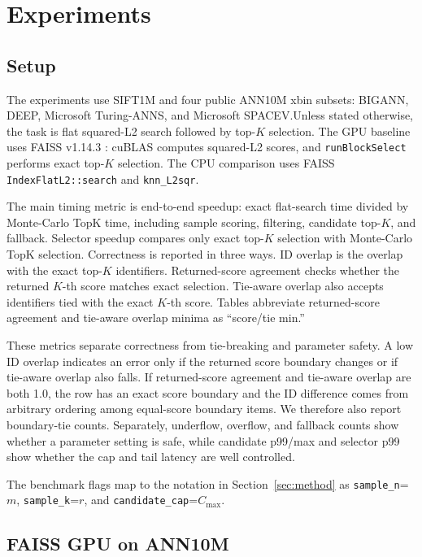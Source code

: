\section{Experiments}

\subsection{Setup}

The experiments use SIFT1M \citep{jegou2011pq,texmexsift} and four public
ANN10M xbin subsets: BIGANN, DEEP, Microsoft Turing-ANNS, and Microsoft
SPACEV.\@ Unless stated otherwise, the task is flat squared-L2 search followed
by top-$K$ selection. The GPU baseline uses FAISS v1.14.3
\citep{faiss2026software}: cuBLAS computes squared-L2 scores, and
\texttt{runBlockSelect} performs exact top-$K$ selection. The CPU comparison
uses FAISS \texttt{IndexFlatL2::search} and \texttt{knn\_L2sqr}.

The main timing metric is end-to-end speedup: exact flat-search time divided by
Monte-Carlo TopK time, including sample scoring, filtering, candidate top-$K$,
and fallback. Selector speedup compares only exact top-$K$ selection with
Monte-Carlo TopK selection. Correctness is reported in three ways. ID overlap is
the overlap with the exact top-$K$ identifiers. Returned-score agreement checks
whether the returned $K$-th score matches exact selection. Tie-aware overlap
also accepts identifiers tied with the exact $K$-th score. Tables abbreviate
returned-score agreement and tie-aware overlap minima as ``score/tie min.''

These metrics separate correctness from tie-breaking and parameter safety. A
low ID overlap indicates an error only if the returned score boundary changes
or if tie-aware overlap also falls. If returned-score agreement and tie-aware
overlap are both 1.0, the row has an exact score boundary and the ID difference
comes from arbitrary ordering among equal-score boundary items. We therefore
also report boundary-tie counts. Separately, underflow, overflow, and fallback
counts show whether a parameter setting is safe, while candidate p99/max and
selector p99 show whether the cap and tail latency are well controlled.

The benchmark flags map to the notation in Section~\ref{sec:method} as
\texttt{sample\_n}=$m$, \texttt{sample\_k}=$r$, and
\texttt{candidate\_cap}=$C_{\max}$.

\subsection{FAISS GPU on ANN10M}

